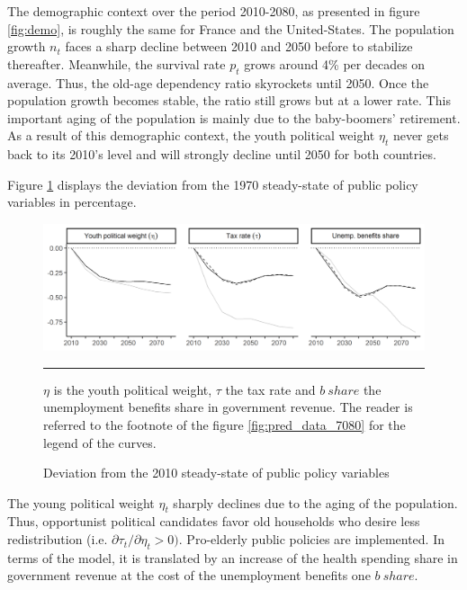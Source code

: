 The demographic context over the period 2010-2080, as presented in figure \ref{fig:demo}, is roughly the same for France and the United-States. The population growth $n_t$ faces a sharp decline between 2010 and 2050 before to stabilize thereafter. Meanwhile, the survival rate $p_t$ grows around 4\% per decades on average. Thus, the old-age dependency ratio skyrockets until 2050. Once the population growth becomes stable, the ratio still grows but at a lower rate. This important aging of the population is mainly due to the baby-boomers' retirement. As a result of this demographic context, the youth political weight $\eta_t$ never gets back to its 2010's level and will strongly decline until 2050 for both countries.


Figure \ref{fig:dev_public_1080} displays the deviation from the 1970 steady-state of public policy variables in percentage.
\begin{figure}[tb]
	\centering
	\includegraphics[width=1\linewidth]{../result/deviation/dev_public1080.png}
	\caption{Deviation from the 2010 steady-state of public policy variables}
	\label{fig:dev_public_1080}
	\vspace{.5ex}
	\hrule
	\vspace{-4ex}
	\justify\singlespacing\footnotesize $\eta$ is the youth political weight, $\tau$ the tax rate and $b~share$ the unemployment benefits share in government revenue. The reader is referred to the footnote of the figure \ref{fig:pred_data_7080} for the legend of the curves.
\end{figure}
The young political weight $\eta_t$ sharply declines due to the aging of the population. Thus, opportunist political candidates favor old households who desire less redistribution (i.e. $\partial\tau_t / \partial \eta_t > 0)$. Pro-elderly public policies are implemented. In terms of the model, it is translated by an increase of the health spending share in government revenue at the cost of the unemployment benefits one $b~share$.

